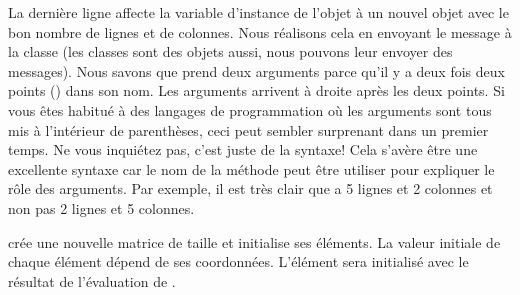 \documentclass[a4paper,10pt,twoside]{book}
\begin{document}
La dernière ligne affecte la variable d'instance  de l'objet
 à un nouvel objet  avec le bon nombre de lignes et de colonnes.
Nous réalisons cela en envoyant le message  à la classe  (les classes sont des objets aussi, nous pouvons leur envoyer des messages).
Nous savons que  prend deux arguments parce qu'il y a deux fois deux points (\ct{:}) dans son nom. Les arguments arrivent à droite après les deux points.
Si vous \^etes habitué à des langages de programmation o\`u les arguments sont tous mis à l'intérieur de parenthèses, ceci peut sembler surprenant dans un premier temps. Ne vous inquiétez pas, c'est juste de la syntaxe!
Cela s'avère \^etre une excellente syntaxe car le nom de la méthode peut \^etre utiliser pour expliquer le rôle des arguments. Par exemple, il est très clair que  a 5 lignes et 2 colonnes et non pas 2 lignes et 5 colonnes.

 crée une nouvelle matrice de taille  et initialise ses éléments. La valeur initiale de chaque élément dépend de ses coordonnées. L'élément  sera initialisé avec le résultat de l'évaluation de .  



\end{document}
